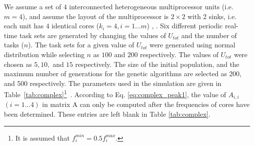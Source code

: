 \documentclass[conference]{IEEEtran}
\begin{document}
We assume a set of $4$ interconnected heterogeneous multiprocessor units (i.e. $m=4$), and
assume the layout of the multiprocessor is $2\times 2$ with 2 sinks, i.e. each unit has $4$ identical cores ($k_i=4, i=1 \ldots m$)  \cite{Chantem10}, \cite{Fisher09}.
Six different periodic real-time task sets
are generated
by changing the values of $U_{tot}$ and the  number of tasks ($n$).
The task sets for a given value of $U_{tot}$ were generated using normal distribution while selecting $n$ as $100$ and $200$ respectively.
The values of $U_{tot}$ were chosen as  $5, 10,$ and $15$ respectively.
The size of the initial population, and the maximum number of generations for the genetic algorithms are selected as 200, and 500 respectively.
The parameters used in the simulation are given in Table~\ref{tab:complex}\footnote{It is assumed that $f_i^{min} = 0.5f_i^{max}$.}~\cite{Fisher09}. According to Eq. \ref{eq:complex_peak1}, the value of $A_{i,i}$ $(i=1\ldots4)$ in matrix A
can only be computed after the frequencies of cores have been determined.
These entries are left blank in Table \ref{tab:complex}.
\end{document}
